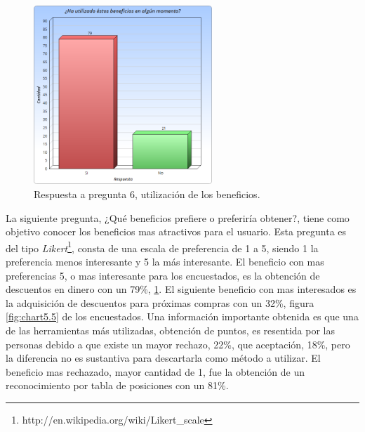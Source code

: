 \begin{figure}[!htb]
    \centering
    \includegraphics[width=0.6\textwidth]{images/Graficos/graf_5_4.png}
    \caption[chart5.4]{Respuesta a pregunta 6, utilización de los beneficios.}
    \label{fig:chart5.4}
\end{figure}


La siguiente pregunta,
¿Qué beneficios prefiere o preferiría obtener?,
tiene como objetivo conocer los  beneficios mas atractivos para el usuario.
Esta pregunta es del tipo \emph{Likert}\footnote{http://en.wikipedia.org/wiki/Likert\_scale}, 
consta de una escala de preferencia de
1 a 5, siendo 1 la preferencia menos interesante y 5 la más interesante.
El beneficio con mas preferencias 5, o mas interesante para los encuestados,
es la obtención de descuentos en dinero con un 79\%, \ref{fig:chart5.4}.
El siguiente beneficio con mas interesados es la adquisición de descuentos para
próximas compras con un 32\%, figura \ref{fig:chart5.5} de los encuestados.
Una información importante obtenida es que una de las herramientas más utilizadas,
obtención de puntos, es resentida por las personas debido a que existe un mayor
rechazo, 22\%, que aceptación, 18\%, pero la diferencia no es sustantiva para
descartarla como método a utilizar.
El beneficio mas rechazado, mayor cantidad de 1, fue la obtención de un
reconocimiento por tabla de posiciones con un 81\%.

